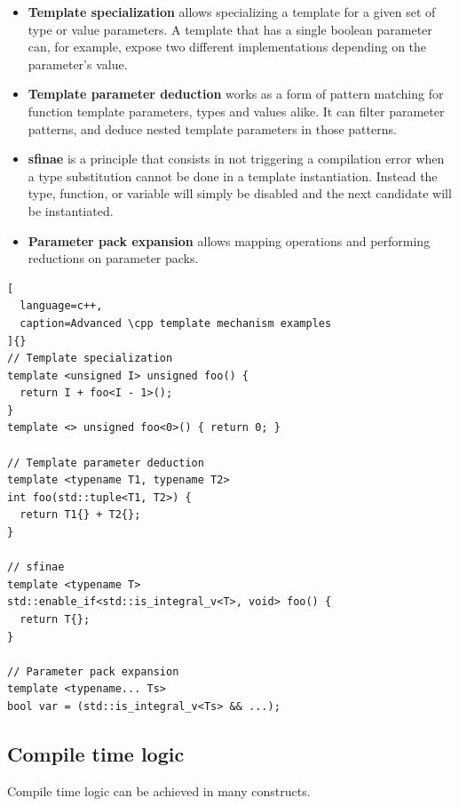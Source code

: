 \documentclass[../main]{subfiles}
\begin{document}
\begin{itemize}
  \item

\textbf{Template specialization} allows specializing a template for a given
set of type or value parameters. A template that has a single boolean parameter
can, for example, expose two different implementations depending on the
parameter's value.

  \item

\textbf{Template parameter deduction} works as a form of pattern matching
for function template parameters, types and values alike. It can filter
parameter patterns, and deduce nested template parameters in those patterns.

  \item

\textbf{\gls{sfinae}} is a \cpp principle that consists in not triggering a
compilation error when a type substitution cannot be done in a template
instantiation. Instead the type, function, or variable will simply be disabled
and the next candidate will be instantiated.

  \item

\textbf{Parameter pack expansion} allows mapping operations and performing
reductions on parameter packs.

\end{itemize}

\begin{lstlisting}[
  language=c++,
  caption=Advanced \cpp template mechanism examples
]{}
// Template specialization
template <unsigned I> unsigned foo() {
  return I + foo<I - 1>();
}
template <> unsigned foo<0>() { return 0; }

// Template parameter deduction
template <typename T1, typename T2>
int foo(std::tuple<T1, T2>) {
  return T1{} + T2{};
}

// sfinae
template <typename T>
std::enable_if<std::is_integral_v<T>, void> foo() {
  return T{};
}

// Parameter pack expansion
template <typename... Ts>
bool var = (std::is_integral_v<Ts> && ...);
\end{lstlisting}

\subsection{
  Compile time logic
}

Compile time logic can be achieved in many \cpp constructs.
\end{document}
